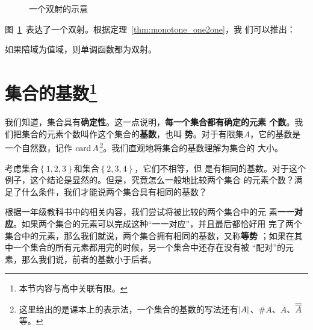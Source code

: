 \begin{figure}[ht]
    \centering
    \caption{一个双射的示意}\label{fig:map_biject}
\end{figure}

图~\ref{fig:map_biject}~表达了一个双射。根据定理~\ref{thm:monotone_one2one}，我
们可以推出：
\begin{rawthm}\label{thm:monotone_biject}
    如果陪域为值域，则单调函数都为双射。
\end{rawthm}

\section[集合的基数]{集合的基数\footnote{本节内容与高中关联有限。}}

我们知道，集合具有\textbf{确定性}。这一点说明，\textbf{每一个集合都有确定的元素
个数}。我们把集合的元素个数叫作这个集合的\textbf{基数}，也叫
\textbf{势}。对于有限集$A$，它的基数是一个自然数，记作
$\operatorname{card}{A}$\footnote{这里给出的是课本上的表示法，一个集合的基数的写法还有$\left|{A}\right|
$、$\# A$、$\overline{A}$、$\overline{\overline{{A}}}$等。}。我们直观地将集合的基数理解为集合的
大小。

考虑集合$\left\{ 1,2,3 \right\} $和集合$\left\{ 2,3,4 \right\} $，它们不相等，但
是有相同的基数。对于这个例子，这个结论是显然的。但是，究竟怎么一般地比较两个集合
的元素个数？满足了什么条件，我们才能说两个集合具有相同的基数？

根据一年级教科书中的相关内容\cite{pep_math_1A}，我们尝试将被比较的两个集合中的元
素\textbf{一一对应}。如果两个集合的元素可以完成这种“一一对应”，并且最后都恰好用
完了两个集合中的元素，那么我们就说，两个集合拥有相同的基数，又称\textbf{等势}
；如果在其中一个集合的所有元素都用完的时候，另一个集合中还存在没有被
“配对”的元素，那么我们说，前者的基数小于后者。

